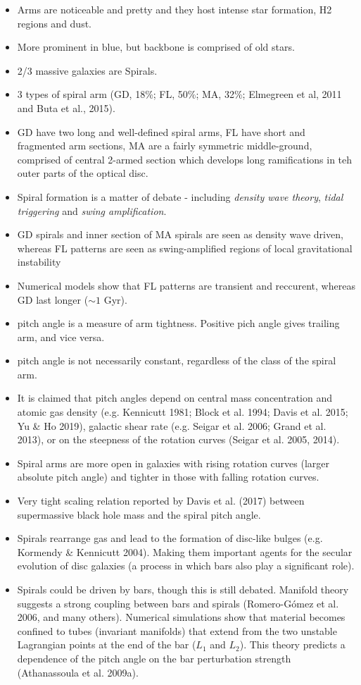 \begin{itemize}
  \item Arms are noticeable and pretty and they host intense star formation, H2 regions and dust.
  \item More prominent in blue, but backbone is comprised of old stars.
  \item 2/3 massive galaxies are Spirals.
  \item 3 types of spiral arm (GD, 18\%; FL, 50\%; MA, 32\%; Elmegreen et al, 2011 and Buta et al., 2015).
  \item GD have two long and well-defined spiral arms, FL have short and fragmented arm sections, MA are a fairly symmetric middle-ground, comprised of central 2-armed section which develops long ramifications in teh outer parts of the optical disc.
  \item Spiral formation is a matter of debate - including \textit{density wave theory}, \textit{tidal triggering} and \textit{swing amplification}.
  \item GD spirals and inner section of MA spirals are seen as density wave driven, whereas FL patterns are seen as swing-amplified regions of local gravitational instability
  \item Numerical models show that FL patterns are transient and reccurent, whereas GD last longer ($\sim1$ Gyr).
  \item pitch angle is a measure of arm tightness. Positive pich angle gives trailing arm, and vice versa.
  \item pitch angle is not necessarily constant, regardless of the class of the spiral arm.
  \item It is claimed that pitch angles depend on central mass concentration and atomic gas density (e.g. Kennicutt 1981; Block et al. 1994; Davis et al. 2015; Yu \& Ho 2019), galactic shear rate (e.g. Seigar et al. 2006; Grand et al. 2013), or on the steepness of the rotation curves (Seigar et al. 2005, 2014).
  \item Spiral arms are more open in galaxies with rising rotation curves (larger absolute pitch angle) and tighter in those with falling rotation curves.
  \item Very tight scaling relation reported by Davis et al. (2017) between supermassive black hole mass and the spiral pitch angle.
  \item Spirals rearrange gas and lead to the formation of disc-like bulges (e.g. Kormendy \& Kennicutt 2004). Making them important agents for the secular evolution of disc galaxies (a process in which bars also play a significant role).
  \item Spirals could be driven by bars, though this is still debated. Manifold theory suggests a strong coupling between bars and spirals (Romero-G\'omez et al. 2006, and many others). Numerical simulations show that material becomes confined to tubes (invariant manifolds) that extend from the two unstable Lagrangian points at the end of the bar ($L_1$ and $L_2$). This theory predicts a dependence of the pitch angle on the bar perturbation strength (Athanassoula et al. 2009a).
\end{itemize}

